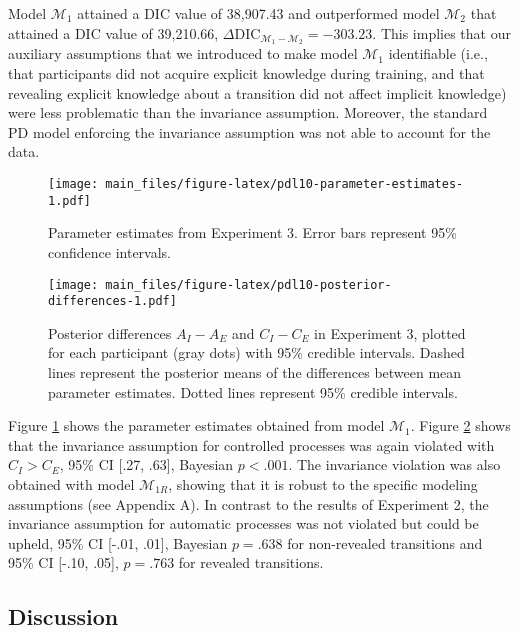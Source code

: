 \documentclass[man]{apa6}
\theoremstyle{definition}
\theoremstyle{definition}
\theoremstyle{definition}
\theoremstyle{remark}
\begin{document}
Model \(\mathcal{M}_1\) attained a DIC value of 38,907.43 and
outperformed model \(\mathcal{M}_2\) that attained a DIC value of
39,210.66,
\(\Delta \textrm{DIC}_{\mathcal{M}_1 - \mathcal{M}_2} = -303.23\). This
implies that our auxiliary assumptions that we introduced to make model
\(\mathcal{M}_1\) identifiable (i.e., that participants did not acquire
explicit knowledge during training, and that revealing explicit
knowledge about a transition did not affect implicit knowledge) were
less problematic than the invariance assumption. Moreover, the standard
PD model enforcing the invariance assumption was not able to account for
the data.

\begin{figure}[htbp]
\centering
\texttt{[image: main\_files/figure-latex/pdl10-parameter-estimates-1.pdf]}
\caption{\label{fig:pdl10-parameter-estimates}Parameter estimates from
Experiment 3. Error bars represent 95\% confidence intervals.}
\end{figure}

\begin{figure}[htbp]
\centering
\texttt{[image: main\_files/figure-latex/pdl10-posterior-differences-1.pdf]}
\caption{\label{fig:pdl10-posterior-differences}Posterior differences
\(A_I - A_E\) and \(C_I - C_E\) in Experiment 3, plotted for each
participant (gray dots) with 95\% credible intervals. Dashed lines
represent the posterior means of the differences between mean parameter
estimates. Dotted lines represent 95\% credible intervals.}
\end{figure}

Figure \ref{fig:pdl10-parameter-estimates} shows the parameter estimates
obtained from model \(\mathcal{M}_1\). Figure
\ref{fig:pdl10-posterior-differences} shows that the invariance
assumption for controlled processes was again violated with
\(C_I > C_E\), 95\% CI {[}.27, .63{]}, Bayesian \(p < .001\). The
invariance violation was also obtained with model \(\mathcal{M}_{1R}\),
showing that it is robust to the specific modeling assumptions (see
Appendix A). In contrast to the results of Experiment 2, the invariance
assumption for automatic processes was not violated but could be upheld,
95\% CI {[}-.01, .01{]}, Bayesian \(p = .638\) for non-revealed
transitions and 95\% CI {[}-.10, .05{]}, \(p = .763\) for revealed
transitions.

\subsection{Discussion}\label{discussion-2}
\end{document}
